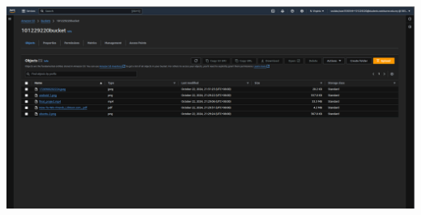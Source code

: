 \documentclass[11pt]{article}
\begin{document}
\begin{enumerate}[resume]
    {\centering
    \includegraphics[width=5.8in]{pics/35.png}
    }


\end{enumerate}


\vspace{1cm}

\newpage
\end{document}
